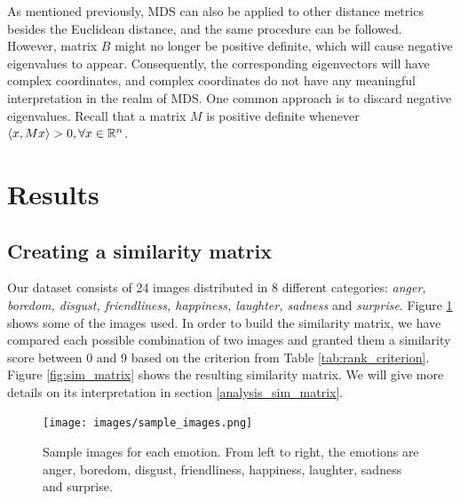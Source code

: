 \documentclass[11pt, a4paper]{article}
\numberwithin{equation}{subsection}
\begin{document}
As mentioned previously, MDS can also be applied to other distance metrics besides the Euclidean distance, and the same procedure can be followed. However, matrix $B$ might no longer be positive definite, which will cause negative eigenvalues to appear. Consequently, the corresponding eigenvectors will have complex coordinates, and complex coordinates do not have any meaningful interpretation in the realm of MDS. One common approach is to discard negative eigenvalues. Recall that a matrix $M$ is positive definite whenever $\langle x, Mx \rangle > 0, \space \forall x \in \mathbb{R}^n$.


\section{Results}\label{analysis}

\subsection{Creating a similarity matrix}\label{sim_matrix_section}

Our dataset consists of 24 images distributed in 8 different categories: \textit{anger, boredom, disgust, friendliness, happiness, laughter, sadness} and \textit{surprise}. Figure \ref{fig:sample_images} shows some of the images used. In order to build the similarity matrix, we have compared each possible combination of two images and granted them a similarity score between 0 and 9 based on the criterion from Table \ref{tab:rank_criterion}. Figure \ref{fig:sim_matrix} shows the resulting similarity matrix. We will give more details on its interpretation in section \ref{analysis_sim_matrix}.

\begin{figure}[h]
    \centering
    \vspace{0in}
    \texttt{[image: images/sample\_images.png]}
    \caption{Sample images for each emotion. From left to right, the emotions are anger, boredom, disgust, friendliness, happiness, laughter, sadness and surprise.}
    \label{fig:sample_images}
\end{figure}
\end{document}

